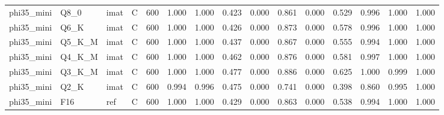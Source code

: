 \begin{tabular}{llllrrrrrrrrrrr}
phi35\_mini & Q8\_0 & imat & C & 600 & 1.000 & 1.000 & 0.423 & 0.000 & 0.861 & 0.000 & 0.529 & 0.996 & 1.000 & 1.000 \\
phi35\_mini & Q6\_K & imat & C & 600 & 1.000 & 1.000 & 0.426 & 0.000 & 0.873 & 0.000 & 0.578 & 0.996 & 1.000 & 1.000 \\
phi35\_mini & Q5\_K\_M & imat & C & 600 & 1.000 & 1.000 & 0.437 & 0.000 & 0.867 & 0.000 & 0.555 & 0.994 & 1.000 & 1.000 \\
phi35\_mini & Q4\_K\_M & imat & C & 600 & 1.000 & 1.000 & 0.462 & 0.000 & 0.876 & 0.000 & 0.581 & 0.997 & 1.000 & 1.000 \\
phi35\_mini & Q3\_K\_M & imat & C & 600 & 1.000 & 1.000 & 0.477 & 0.000 & 0.886 & 0.000 & 0.625 & 1.000 & 0.999 & 1.000 \\
phi35\_mini & Q2\_K & imat & C & 600 & 0.994 & 0.996 & 0.475 & 0.000 & 0.741 & 0.000 & 0.398 & 0.860 & 0.995 & 1.000 \\
phi35\_mini & F16 & ref & C & 600 & 1.000 & 1.000 & 0.429 & 0.000 & 0.863 & 0.000 & 0.538 & 0.994 & 1.000 & 1.000 \\
\bottomrule
\end{tabular}
